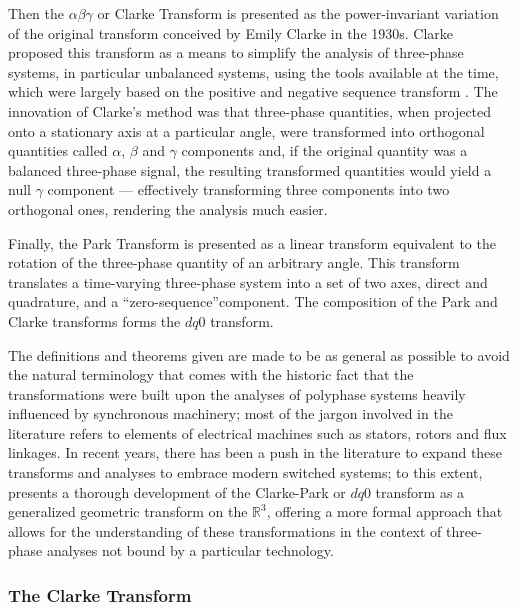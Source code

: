 	Then the $\alpha\beta\gamma$ or Clarke Transform is presented as the power-invariant variation of the original transform conceived by Emily Clarke in the 1930s. Clarke proposed this transform as a means to simplify the analysis of three-phase systems, in particular unbalanced systems, using the tools available at the time, which were largely based on the positive and negative sequence transform . The innovation of Clarke's method was that three-phase quantities, when projected onto a stationary axis at a particular angle, were transformed into orthogonal quantities called $\alpha$, $\beta$ and $\gamma$ components and, if the original quantity was a balanced three-phase signal, the resulting transformed quantities would yield a null $\gamma$ component — effectively transforming three components into two orthogonal ones, rendering the analysis much easier.

	Finally, the Park Transform is presented as a linear transform equivalent to the rotation of the three-phase quantity of an arbitrary angle. This transform translates a time-varying three-phase system into a set of two axes, direct and quadrature, and a ``zero-sequence''component. The composition of the Park and Clarke transforms forms the $dq0$ transform.

	The definitions and theorems given are made to be as general as possible to avoid the natural terminology that comes with the historic fact that the transformations were built upon the analyses of polyphase systems heavily influenced by synchronous machinery; most of the jargon involved in the literature refers to elements of electrical machines such as stators, rotors and flux linkages. In recent years, there has been a push in the literature to expand these transforms and analyses to embrace modern switched systems; to this extent, \cite{orourkeGeometricInterpretationReference2019} presents a thorough development of the Clarke-Park or $dq0$ transform as a generalized geometric transform on the $\mathbb{R}^3$, offering a more formal approach that allows for the understanding of these transformations in the context of three-phase analyses not bound by a particular technology.

\subsubsection{The Clarke Transform} %

